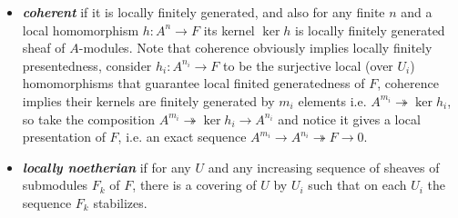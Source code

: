 \begin{defn}
\begin{itemize}
	\item \textbf{\textit{coherent}} if it is locally finitely generated, and also for any finite $n$ and a local homomorphism $h : A^n \to F$ its kernel $\ker h$ is locally finitely generated sheaf of $A$-modules. Note that coherence obviously implies locally finitely presentedness,  consider $h_i : A^{n_i} \to F$ to be the surjective local (over $U_i$) homomorphisms that guarantee local finited generatedness of $F$, coherence implies their kernels are finitely generated by $m_i$ elements i.e. $A^{m_i} \twoheadrightarrow \ker h_i$, so take the composition $A^{m_i}\twoheadrightarrow \ker h_i \to A^{n_i}$ and notice it gives a local presentation of $F$, i.e. an exact sequence $A^{m_i} \to A^{n_i}\twoheadrightarrow F\to 0$.

		\item \textbf{\textit{locally noetherian}} if for any $U$ and any increasing sequence of sheaves of submodules $F_k$ of $F$, there is a covering of $U$ by $U_i$ such that on each $U_i$ the sequence $F_k$ stabilizes. 
	\end{itemize}
\end{defn}


